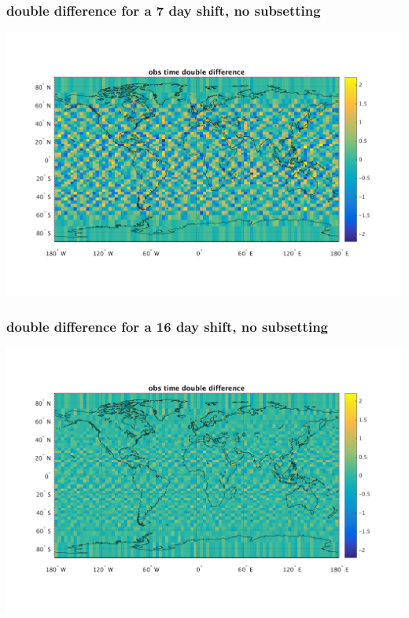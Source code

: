 \documentclass[11pt]{beamer}
\begin{document}
\begin{frame}
\frametitle{double difference for a 7 day shift, no subsetting}
\begin{center}
  \includegraphics[scale=0.5]{slackfigs/ddiff_7_day_shift.png}
\end{center}
\end{frame} %
\begin{frame}
\frametitle{double difference for a 16 day shift, no subsetting}
\begin{center}
  \includegraphics[scale=0.5]{slackfigs/ddiff_16_day_shift.png}
\end{center}
\end{frame} %
\end{document}
